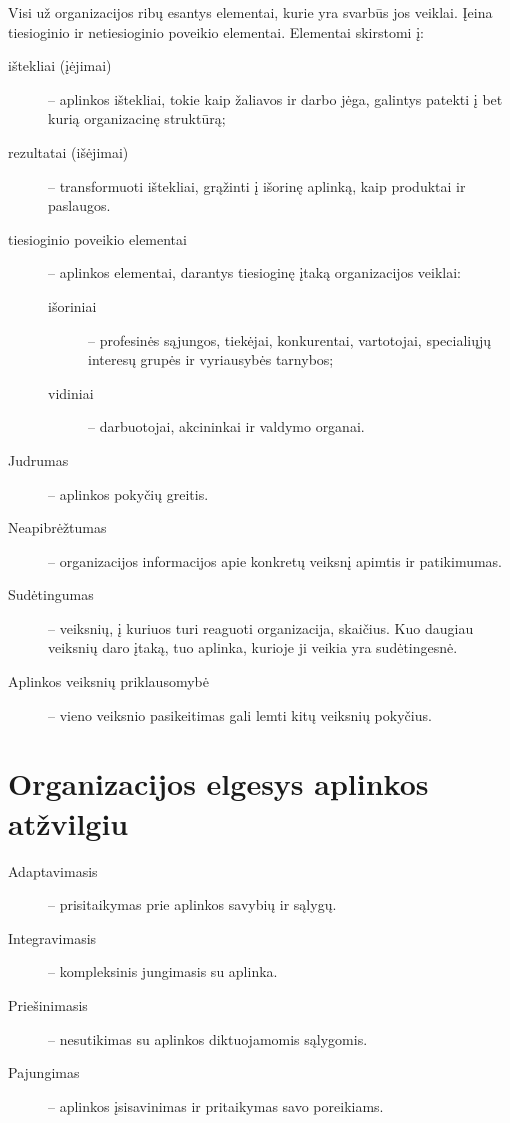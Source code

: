 \begin{defn}
  Visi už organizacijos ribų esantys elementai, kurie yra svarbūs
  jos veiklai. Įeina tiesioginio ir netiesioginio poveikio
  elementai. Elementai skirstomi į:
  \begin{description}
    \item[ištekliai (įėjimai)] – aplinkos ištekliai, tokie kaip
      žaliavos ir darbo jėga, galintys patekti į bet kurią
      organizacinę struktūrą;
    \item[rezultatai (išėjimai)] – transformuoti ištekliai, grąžinti
      į išorinę aplinką, kaip produktai ir paslaugos.
    \item[tiesioginio poveikio elementai] – aplinkos elementai,
      darantys tiesioginę įtaką organizacijos veiklai:
      \begin{description}
        \item[išoriniai] – profesinės sąjungos, tiekėjai, konkurentai,
          vartotojai, specialiųjų interesų grupės ir vyriausybės
          tarnybos;
        \item[vidiniai] – darbuotojai, akcininkai ir valdymo organai.
      \end{description}
  \end{description}
\end{defn}

\begin{description}
  \item[Judrumas] – aplinkos pokyčių greitis.
  \item[Neapibrėžtumas] – organizacijos informacijos apie konkretų
    veiksnį apimtis ir patikimumas.
  \item[Sudėtingumas] – veiksnių, į kuriuos turi reaguoti organizacija,
    skaičius. Kuo daugiau veiksnių daro įtaką, tuo aplinka, kurioje
    ji veikia yra sudėtingesnė.
  \item[Aplinkos veiksnių priklausomybė] – vieno veiksnio pasikeitimas
    gali lemti kitų veiksnių pokyčius.
\end{description}

\section{Organizacijos elgesys aplinkos atžvilgiu}

\begin{description}
  \item[Adaptavimasis] – prisitaikymas prie aplinkos savybių ir sąlygų.
  \item[Integravimasis] – kompleksinis jungimasis su aplinka.
  \item[Priešinimasis] – nesutikimas su aplinkos diktuojamomis sąlygomis.
  \item[Pajungimas] – aplinkos įsisavinimas ir pritaikymas savo poreikiams.
\end{description}

